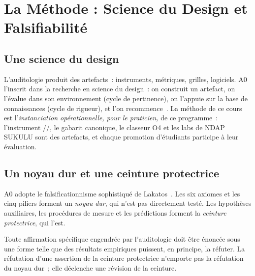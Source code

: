 \section{La Méthode : Science du Design et Falsifiabilité}
\label{sec:c21-methode}

\subsection{Une science du design}

L'auditologie produit des artefacts~: instruments, métriques, grilles,
logiciels. A0 l'inscrit dans la recherche en science du design~: on
construit un artefact, on l'évalue dans son environnement (cycle de
pertinence), on l'appuie sur la base de connaissances (cycle de rigueur),
et l'on recommence~\cite{hevner2004design}. La méthode de ce cours est
l'\emph{instanciation opérationnelle, pour le praticien,} de ce programme~:
l'instrument \OUI{}/\NON{}/\NEK{}, le gabarit canonique, le classeur O4 et
les labs de NDAP SUKULU sont des artefacts, et chaque promotion
d'étudiants participe à leur évaluation.

\subsection{Un noyau dur et une ceinture protectrice}

A0 adopte le falsificationnisme sophistiqué de Lakatos~\cite{lakatos1970}.
Les six axiomes et les cinq piliers forment un \emph{noyau dur}, qui n'est
pas directement testé. Les hypothèses auxiliaires, les procédures de
mesure et les prédictions forment la \emph{ceinture protectrice}, qui l'est.

\begin{axiome}
Toute affirmation spécifique engendrée par l'auditologie doit être énoncée
sous une forme telle que des résultats empiriques puissent, en principe, la
réfuter. La réfutation d'une assertion de la ceinture protectrice n'emporte
pas la réfutation du noyau dur~; elle déclenche une révision de la
ceinture.
\end{axiome}

